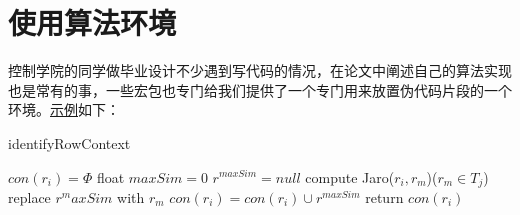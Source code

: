 \section{使用算法环境}
控制学院的同学做毕业设计不少遇到写代码的情况，在论文中阐述自己的算法实现也是常有的事，一些宏包也专门给我们提供了一个专门用来放置伪代码片段的一个环境。\href{http://blog.sina.com.cn/s/blog_5e16f1770100lp7u.html}{示例}如下：\\
\begin{algorithm}[H]
\caption{identifyRowContext}
$con(r_i)= \Phi$\;
{
 float $maxSim=0$\;
 $r^{maxSim}=null$\;
 {
     compute Jaro($r_i,r_m$)($r_m \in T_j$)\;
      {
           replace $r^maxSim$ with $r_m$\;
      }   
 }
$con(r_i)=con(r_i) \cup {r^{maxSim}}$\;
}
return $con(r_i)$\;
\end{algorithm}

